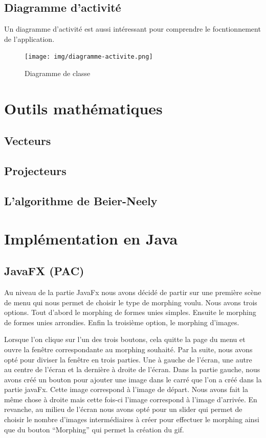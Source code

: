 \documentclass[11pt, titlepage]{article}
\begin{document}
\subsection{Diagramme d'activité}

Un diagramme d'activité est aussi intéressant pour comprendre le focntionnement de l'application.

\begin{figure}[h]
	\centering
	\texttt{[image: img/diagramme-activite.png]}
	\caption{Diagramme de classe}
\end{figure}


\section{Outils mathématiques}

\subsection{Vecteurs}

\subsection{Projecteurs}

\subsection{L'algorithme de Beier-Neely}


\section{Implémentation en Java}

\subsection{JavaFX (PAC)}

Au niveau de la partie JavaFx nous avons décidé de partir sur une première scène de menu qui nous permet de choisir le type de morphing voulu. Nous avons trois options. Tout d’abord le morphing de formes unies simples. Ensuite le morphing de formes unies arrondies. Enfin la troisième option, le morphing d’images.

Lorsque l’on clique sur l’un des trois boutons, cela quitte la page du menu et ouvre la fenêtre correspondante au morphing souhaité. Par la suite, nous avons opté pour diviser la fenêtre en trois parties. Une à gauche de l’écran, une autre au centre de l’écran et la dernière à droite de l’écran. Dans la partie gauche, nous avons créé un bouton pour ajouter une image dans le carré que l’on a créé dans la partie javaFx. Cette image correspond à l’image de départ. Nous avons fait la même chose à droite mais cette fois-ci l’image correspond à l’image d’arrivée. En revanche, au milieu de l’écran nous avons opté pour un slider qui permet de choisir le nombre d’images intermédiaires à créer pour effectuer le morphing ainsi que du bouton “Morphing” qui permet la création du gif.
\end{document}
